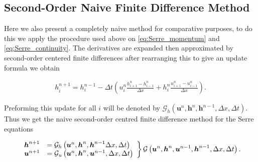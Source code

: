 \documentclass[SingleSpace,12pt,Proceedings]{Serre_ASCE}
\begin{document}
\subsection{Second-Order Naive Finite Difference Method}
Here we also present a completely naive method for comparative purposes, to do this we apply the procedure used above on \eqref{eq:Serre_momentum} and \eqref{eq:Serre_continuity}. The derivatives are expanded then approximated by second-order centered finite differences after rearranging this to give an update formula we obtain
\begin{linenomath*}
\begin{gather}
h^{n+1}_i = h^{n-1}_i - \Delta t \left(u^{n}_{i}\frac{h^{n}_{i+1} - h^{n}_{i-1}}{\Delta x} + h^{n}_{i}\frac{u^{n}_{i+1} - u^{n}_{i-1}}{\Delta x}\right).
\end{gather}
\end{linenomath*}
Preforming this update for all $i$ will be denoted by $\mathcal{G}_h\left(\boldsymbol{u}^n,\boldsymbol{h}^n,\boldsymbol{h}^{n-1} ,\Delta x, \Delta t \right)$.
Thus we get the naive second-order centred finite difference method for the Serre equations
\begin{linenomath*}
\begin{gather}
\left.
\begin{array}{l l}
\boldsymbol{h}^{n+1}&=\mathcal{G}_h\left(\boldsymbol{u}^n,\boldsymbol{h}^n,\boldsymbol{h}^{n-1} \Delta x, \Delta t \right) \\
\boldsymbol{u}^{n+1}&=\mathcal{G}_u\left(\boldsymbol{u}^n,\boldsymbol{h}^n, \boldsymbol{u}^{n-1}, \Delta x, \Delta t \right)
\end{array} \right\rbrace \mathcal{G}\left(\boldsymbol{u}^n,\boldsymbol{h}^n, \boldsymbol{u}^{n-1},\boldsymbol{h}^{n-1}, \Delta x, \Delta t \right).
\end{gather}
\end{linenomath*}
\end{document}
